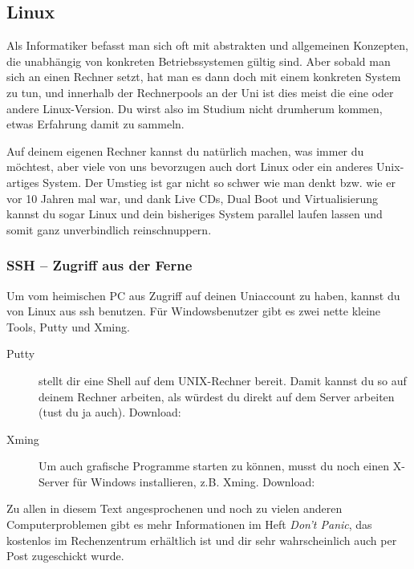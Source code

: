 

\subsection{Linux}
	\label{linux}
	Als Informatiker befasst man sich oft mit abstrakten und allgemeinen Konzepten, die unabhängig von konkreten Betriebssystemen gültig sind. Aber sobald man sich an einen Rechner setzt, hat man es dann doch mit einem konkreten System zu tun, und innerhalb der Rechnerpools an der Uni ist dies meist die eine oder andere Linux-Version. Du wirst also im Studium nicht drumherum kommen, etwas Erfahrung damit zu sammeln.

	Auf deinem eigenen Rechner kannst du natürlich machen, was immer du möchtest, aber viele von uns bevorzugen auch dort Linux oder ein anderes Unix-artiges System. Der Umstieg ist gar nicht so schwer wie man denkt bzw. wie er vor 10 Jahren mal war, und dank Live CDs, Dual Boot und Virtualisierung kannst du sogar Linux und dein bisheriges System parallel laufen lassen und somit ganz unverbindlich reinschnuppern.


	\subsubsection{SSH -- Zugriff aus der Ferne}
		Um vom heimischen PC aus Zugriff auf deinen Uniaccount zu haben, kannst du von Linux aus ssh benutzen. Für Windowsbenutzer gibt es zwei nette kleine Tools, Putty und Xming. %

		\begin{description}
			\item[Putty] stellt dir eine Shell auf dem UNIX-Rechner bereit. Damit kannst du so auf deinem Rechner arbeiten, als würdest du direkt auf dem Server arbeiten (tust du ja auch).  Download: 
			\item[Xming] Um auch grafische Programme starten zu können, musst du noch einen X-Server für Windows
			  installieren, z.B. Xming. Download: 
		\end{description}

		Zu allen in diesem Text angesprochenen und noch zu vielen anderen Computerproblemen gibt es mehr Informationen im Heft \emph{Don't Panic}, das kostenlos im Rechenzentrum erhältlich ist und dir sehr wahrscheinlich auch per Post zugeschickt wurde.

